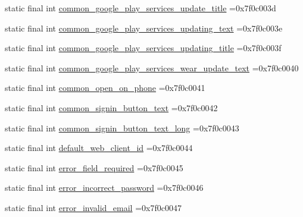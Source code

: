 \begin{DoxyCompactItemize}
\item 
static final int \mbox{\hyperlink{classbr_1_1unb_1_1cic_1_1mp_1_1marketmaster_1_1R_1_1string_aeb7d685835a2731429037eb34e01b823}{common\+\_\+google\+\_\+play\+\_\+services\+\_\+update\+\_\+title}} =0x7f0c003d
\item 
static final int \mbox{\hyperlink{classbr_1_1unb_1_1cic_1_1mp_1_1marketmaster_1_1R_1_1string_a5b4206cd6cc7667062006a3891a39982}{common\+\_\+google\+\_\+play\+\_\+services\+\_\+updating\+\_\+text}} =0x7f0c003e
\item 
static final int \mbox{\hyperlink{classbr_1_1unb_1_1cic_1_1mp_1_1marketmaster_1_1R_1_1string_a5f63bc950d8e6aad6a6767166b88e123}{common\+\_\+google\+\_\+play\+\_\+services\+\_\+updating\+\_\+title}} =0x7f0c003f
\item 
static final int \mbox{\hyperlink{classbr_1_1unb_1_1cic_1_1mp_1_1marketmaster_1_1R_1_1string_a5135b34df8e15fdd6dbcf8f21de952a6}{common\+\_\+google\+\_\+play\+\_\+services\+\_\+wear\+\_\+update\+\_\+text}} =0x7f0c0040
\item 
static final int \mbox{\hyperlink{classbr_1_1unb_1_1cic_1_1mp_1_1marketmaster_1_1R_1_1string_a0a008390482a206a4210a1c2634b5f9a}{common\+\_\+open\+\_\+on\+\_\+phone}} =0x7f0c0041
\item 
static final int \mbox{\hyperlink{classbr_1_1unb_1_1cic_1_1mp_1_1marketmaster_1_1R_1_1string_a354ac42276c072a8f9a7587494f976de}{common\+\_\+signin\+\_\+button\+\_\+text}} =0x7f0c0042
\item 
static final int \mbox{\hyperlink{classbr_1_1unb_1_1cic_1_1mp_1_1marketmaster_1_1R_1_1string_a4616f869c6e69228829c9cca6e7ef814}{common\+\_\+signin\+\_\+button\+\_\+text\+\_\+long}} =0x7f0c0043
\item 
static final int \mbox{\hyperlink{classbr_1_1unb_1_1cic_1_1mp_1_1marketmaster_1_1R_1_1string_a57f5fd4fb84c8fe702277c3a99bbad71}{default\+\_\+web\+\_\+client\+\_\+id}} =0x7f0c0044
\item 
static final int \mbox{\hyperlink{classbr_1_1unb_1_1cic_1_1mp_1_1marketmaster_1_1R_1_1string_a6c48218b86e105202e1ddd156ce1867b}{error\+\_\+field\+\_\+required}} =0x7f0c0045
\item 
static final int \mbox{\hyperlink{classbr_1_1unb_1_1cic_1_1mp_1_1marketmaster_1_1R_1_1string_aaf401fb1e40f37a560bd8e2a3aa72686}{error\+\_\+incorrect\+\_\+password}} =0x7f0c0046
\item 
static final int \mbox{\hyperlink{classbr_1_1unb_1_1cic_1_1mp_1_1marketmaster_1_1R_1_1string_aae31751e149b2c4b70222d82c0c2767b}{error\+\_\+invalid\+\_\+email}} =0x7f0c0047

\end{DoxyCompactItemize}

